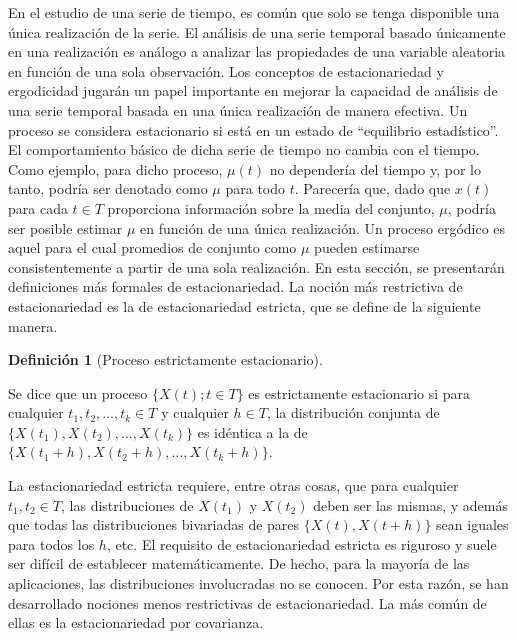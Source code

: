\documentclass[
  letterpaper,
  DIV=11,
  numbers=noendperiod]{scrreport}
\theoremstyle{plain}
\theoremstyle{definition}
\newtheorem{definition}{Definición}[chapter]
\theoremstyle{definition}
\theoremstyle{plain}
\theoremstyle{remark}
\begin{document}
En el estudio de una serie de tiempo, es común que solo se tenga
disponible una única realización de la serie. El análisis de una serie
temporal basado únicamente en una realización es análogo a analizar las
propiedades de una variable aleatoria en función de una sola
observación. Los conceptos de estacionariedad y ergodicidad jugarán un
papel importante en mejorar la capacidad de análisis de una serie
temporal basada en una única realización de manera efectiva. Un proceso
se considera estacionario si está en un estado de ``equilibrio
estadístico''. El comportamiento básico de dicha serie de tiempo no
cambia con el tiempo. Como ejemplo, para dicho proceso, \(\mu(t)\) no
dependería del tiempo y, por lo tanto, podría ser denotado como \(\mu\)
para todo \(t\). Parecería que, dado que \(x(t)\) para cada \(t\in T\)
proporciona información sobre la media del conjunto, \(\mu\), podría ser
posible estimar \(\mu\) en función de una única realización. Un proceso
ergódico es aquel para el cual promedios de conjunto como \(\mu\) pueden
estimarse consistentemente a partir de una sola realización. En esta
sección, se presentarán definiciones más formales de estacionariedad. La
noción más restrictiva de estacionariedad es la de estacionariedad
estricta, que se define de la siguiente manera.

\begin{definition}[Proceso estrictamente
estacionario]\protect\hypertarget{def-PPE}{}\label{def-PPE}

Se dice que un proceso \(\{X(t); t \in T\}\) es estrictamente
estacionario si para cualquier \(t_1, t_2,\ldots, t_k \in T\) y
cualquier \(h \in T\), la distribución conjunta de
\(\{X(t_1), X(t_2),\ldots , X(t_k)\}\) es idéntica a la de
\(\{X(t_1 + h), X(t_2 + h),\ldots, X(t_k + h)\}\).

\end{definition}

La estacionariedad estricta requiere, entre otras cosas, que para
cualquier \(t_1, t_2 \in T\), las distribuciones de \(X(t_1)\) y
\(X(t_2)\) deben ser las mismas, y además que todas las distribuciones
bivariadas de pares \(\{X(t), X(t + h)\}\) sean iguales para todos los
\(h\), etc. El requisito de estacionariedad estricta es riguroso y suele
ser difícil de establecer matemáticamente. De hecho, para la mayoría de
las aplicaciones, las distribuciones involucradas no se conocen. Por
esta razón, se han desarrollado nociones menos restrictivas de
estacionariedad. La más común de ellas es la estacionariedad por
covarianza.
\end{document}
